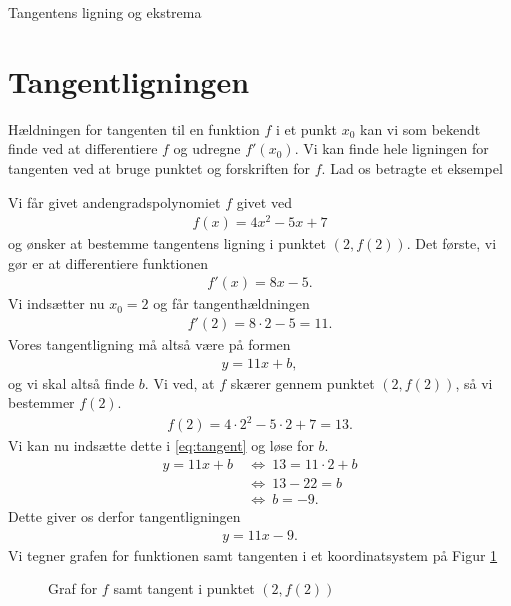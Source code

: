 \begin{center}
	\Huge
	Tangentens ligning og ekstrema
\end{center}

\section*{Tangentligningen}

Hældningen for tangenten til en funktion $f$ i et punkt $x_0$ kan vi som bekendt finde ved at differentiere $f$
og udregne $f'(x_0)$. Vi kan finde hele ligningen for tangenten ved at bruge punktet og forskriften for $f$. Lad os betragte et eksempel
\begin{exa}
	Vi får givet andengradspolynomiet $f$ givet ved
	\begin{align*}
		f(x) = 4x^2-5x+7
	\end{align*}
	og ønsker at bestemme tangentens ligning i punktet $(2,f(2))$. Det første, vi gør er at differentiere 
	funktionen
	\begin{align*}
		f'(x) = 8x - 5.
	\end{align*}
	Vi indsætter nu $x_0 = 2$ og får tangenthældningen
	\begin{align*}
		f'(2) = 8\cdot 2 - 5 = 11.
	\end{align*}
	Vores tangentligning må altså være på formen
	\begin{align}\label{eq:tangent}
		y = 11x + b,
	\end{align}
	og vi skal altså finde $b$. Vi ved, at $f$ skærer gennem punktet $(2,f(2))$, så vi bestemmer $f(2)$.
	\begin{align*}
		f(2) = 4\cdot 2^2-5\cdot 2 + 7 = 13.
	\end{align*}
	Vi kan nu indsætte dette i \eqref{eq:tangent} og løse for $b$.
	\begin{align*}
		y = 11x + b \ &\Leftrightarrow \ 13 = 11\cdot 2 + b \\
		&\Leftrightarrow	 \ 13 - 22 = b \\
		&\Leftrightarrow	 \ b = -9.
	\end{align*}
	Dette giver os derfor tangentligningen 
	\begin{align*}
		y = 11x-9.
	\end{align*}
	Vi tegner grafen for funktionen samt tangenten i et koordinatsystem på Figur \ref{fig:tangent}
	\begin{figure}[H]
		\centering
		\caption{Graf for $f$ samt tangent i punktet $(2,f(2))$}
		\label{fig:tangent}
	\end{figure}
	\phantom{h}
\end{exa}
